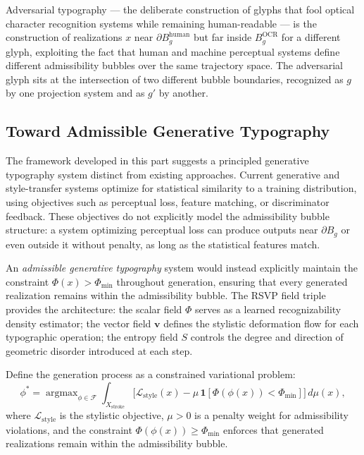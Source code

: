\documentclass[12pt, a4paper]{article}
\theoremstyle{essaystyle}
\begin{document}
Adversarial typography --- the deliberate construction of glyphs that fool optical
character recognition systems while remaining human-readable --- is the construction
of realizations $x$ near $\partial B_g^{\mathrm{human}}$ but far inside
$B_g^{\mathrm{OCR}}$ for a different glyph, exploiting the fact that human and
machine perceptual systems define different admissibility bubbles over the same
trajectory space. The adversarial glyph sits at the intersection of two different
bubble boundaries, recognized as $g$ by one projection system and as $g'$ by another.

\subsection{Toward Admissible Generative Typography}

The framework developed in this part suggests a principled generative typography system
distinct from existing approaches. Current generative and style-transfer systems
optimize for statistical similarity to a training distribution, using objectives such
as perceptual loss, feature matching, or discriminator feedback. These objectives do
not explicitly model the admissibility bubble structure: a system optimizing perceptual
loss can produce outputs near $\partial B_g$ or even outside it without penalty, as
long as the statistical features match.

An \emph{admissible generative typography} system would instead explicitly maintain
the constraint $\Phi(x) > \Phi_{\min}$ throughout generation, ensuring that every
generated realization remains within the admissibility bubble. The RSVP field triple
provides the architecture: the scalar field $\Phi$ serves as a learned recognizability
density estimator; the vector field $\mathbf{v}$ defines the stylistic deformation
flow for each typographic operation; the entropy field $S$ controls the degree and
direction of geometric disorder introduced at each step.

Define the generation process as a constrained variational problem:
\[
\phi^* = \operatorname{argmax}_{\phi \in \mathcal{F}} \int_{X_{\mathrm{stroke}}}
\bigl[\mathcal{L}_{\mathrm{style}}(x) - \mu\,\mathbf{1}[\Phi(\phi(x)) < \Phi_{\min}]\bigr]
\,d\mu(x),
\]
where $\mathcal{L}_{\mathrm{style}}$ is the stylistic objective, $\mu > 0$ is a penalty
weight for admissibility violations, and the constraint $\Phi(\phi(x)) \geq \Phi_{\min}$
enforces that generated realizations remain within the admissibility bubble.
\end{document}
